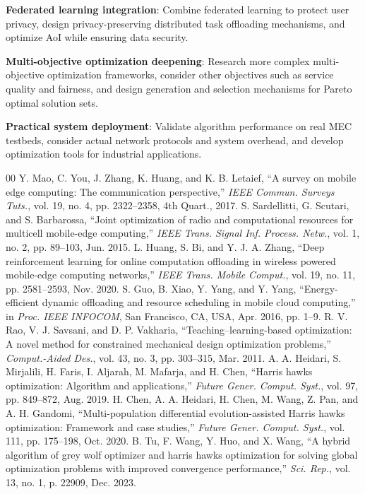 \documentclass[conference]{IEEEtran}
\begin{document}
\textbf{Federated learning integration}: Combine federated learning to protect user privacy, design privacy-preserving distributed task offloading mechanisms, and optimize AoI while ensuring data security.

\textbf{Multi-objective optimization deepening}: Research more complex multi-objective optimization frameworks, consider other objectives such as service quality and fairness, and design generation and selection mechanisms for Pareto optimal solution sets.

\textbf{Practical system deployment}: Validate algorithm performance on real MEC testbeds, consider actual network protocols and system overhead, and develop optimization tools for industrial applications.

\begin{thebibliography}{00}
 Y. Mao, C. You, J. Zhang, K. Huang, and K. B. Letaief, ``A survey on mobile edge computing: The communication perspective,'' \textit{IEEE Commun. Surveys Tuts.}, vol. 19, no. 4, pp. 2322--2358, 4th Quart., 2017.
 S. Sardellitti, G. Scutari, and S. Barbarossa, ``Joint optimization of radio and computational resources for multicell mobile-edge computing,'' \textit{IEEE Trans. Signal Inf. Process. Netw.}, vol. 1, no. 2, pp. 89--103, Jun. 2015.
 L. Huang, S. Bi, and Y. J. A. Zhang, ``Deep reinforcement learning for online computation offloading in wireless powered mobile-edge computing networks,'' \textit{IEEE Trans. Mobile Comput.}, vol. 19, no. 11, pp. 2581--2593, Nov. 2020.
 S. Guo, B. Xiao, Y. Yang, and Y. Yang, ``Energy-efficient dynamic offloading and resource scheduling in mobile cloud computing,'' in \textit{Proc. IEEE INFOCOM}, San Francisco, CA, USA, Apr. 2016, pp. 1--9.
 R. V. Rao, V. J. Savsani, and D. P. Vakharia, ``Teaching--learning-based optimization: A novel method for constrained mechanical design optimization problems,'' \textit{Comput.-Aided Des.}, vol. 43, no. 3, pp. 303--315, Mar. 2011.
 A. A. Heidari, S. Mirjalili, H. Faris, I. Aljarah, M. Mafarja, and H. Chen, ``Harris hawks optimization: Algorithm and applications,'' \textit{Future Gener. Comput. Syst.}, vol. 97, pp. 849--872, Aug. 2019.
 H. Chen, A. A. Heidari, H. Chen, M. Wang, Z. Pan, and A. H. Gandomi, ``Multi-population differential evolution-assisted Harris hawks optimization: Framework and case studies,'' \textit{Future Gener. Comput. Syst.}, vol. 111, pp. 175--198, Oct. 2020.
 B. Tu, F. Wang, Y. Huo, and X. Wang, ``A hybrid algorithm of grey wolf optimizer and harris hawks optimization for solving global optimization problems with improved convergence performance,'' \textit{Sci. Rep.}, vol. 13, no. 1, p. 22909, Dec. 2023.

\end{thebibliography}
\end{document}
